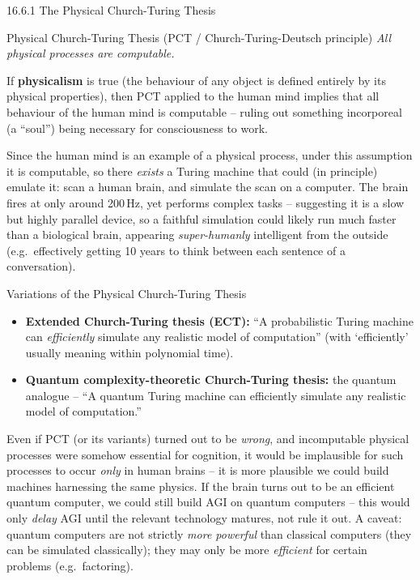 \documentclass[aspectratio=169,10pt]{beamer}
\begin{document}
\begin{frame}{16.6.1 The Physical Church-Turing Thesis}
  \begin{block}{Physical Church-Turing Thesis (PCT / Church-Turing-Deutsch principle)}
    \emph{All physical processes are computable.}
  \end{block}

  If \textbf{physicalism} is true (the behaviour of any object is defined
  entirely by its physical properties), then PCT applied to the human mind
  implies that all behaviour of the human mind is computable -- ruling out
  something incorporeal (a ``soul'') being necessary for consciousness to
  work.

  \vspace{0.3em}
  Since the human mind is an example of a physical process, under this
  assumption it is computable, so there \emph{exists} a Turing machine that
  could (in principle) emulate it: scan a human brain, and simulate the
  scan on a computer. The brain fires at only around 200\,Hz, yet performs
  complex tasks -- suggesting it is a slow but highly parallel device, so a
  faithful simulation could likely run much faster than a biological brain,
  appearing \emph{super-humanly} intelligent from the outside (e.g.\
  effectively getting 10 years to think between each sentence of a
  conversation).
\end{frame}

\begin{frame}{Variations of the Physical Church-Turing Thesis}
  \begin{itemize}
    \item \textbf{Extended Church-Turing thesis (ECT):} ``A probabilistic
      Turing machine can \emph{efficiently} simulate any realistic model of
      computation'' (with `efficiently' usually meaning within polynomial
      time).
    \item \textbf{Quantum complexity-theoretic Church-Turing thesis:} the
      quantum analogue -- ``A quantum Turing machine can efficiently
      simulate any realistic model of computation.''
  \end{itemize}

  \vspace{0.4em}
  Even if PCT (or its variants) turned out to be \emph{wrong}, and
  incomputable physical processes were somehow essential for cognition, it
  would be implausible for such processes to occur \emph{only} in human
  brains -- it is more plausible we could build machines harnessing the
  same physics. If the brain turns out to be an efficient quantum computer,
  we could still build AGI on quantum computers -- this would only
  \emph{delay} AGI until the relevant technology matures, not rule it out.
  A caveat: quantum computers are not strictly \emph{more powerful} than
  classical computers (they can be simulated classically); they may only
  be more \emph{efficient} for certain problems (e.g.\ factoring).
\end{frame}
\end{document}
